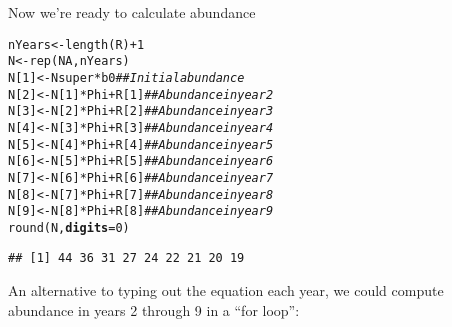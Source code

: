 \documentclass[12pt]{article}\usepackage[]{graphicx}\usepackage[]{color}
\makeatletter
\newcommand{\hlnum}[1]{\textcolor[rgb]{0.69,0.494,0}{#1}}%
\newcommand{\hlcom}[1]{\textcolor[rgb]{0.514,0.506,0.514}{\textit{#1}}}%
\newcommand{\hlopt}[1]{\textcolor[rgb]{0,0,0}{#1}}%
\newcommand{\hlstd}[1]{\textcolor[rgb]{0,0,0}{#1}}%
\newcommand{\hlkwb}[1]{\textcolor[rgb]{0,0.341,0.682}{#1}}%
\newcommand{\hlkwc}[1]{\textcolor[rgb]{0,0,0}{\textbf{#1}}}%
\newcommand{\hlkwd}[1]{\textcolor[rgb]{0.004,0.004,0.506}{#1}}%
\newenvironment{kframe}{%
 \def\at@end@of@kframe{}%
 \ifinner\ifhmode%
  \def\at@end@of@kframe{\end{minipage}}%
  \begin{minipage}{\columnwidth}%
 \fi\fi%
 \def\FrameCommand##1{\hskip\@totalleftmargin \hskip-\fboxsep
 \colorbox{shadecolor}{##1}\hskip-\fboxsep
     \hskip-\linewidth \hskip-\@totalleftmargin \hskip\columnwidth}%
 \MakeFramed {\advance\hsize-\width
   \@totalleftmargin\z@ \linewidth\hsize
   \@setminipage}}%
 {\par\unskip\endMakeFramed%
 \at@end@of@kframe}
\newenvironment{knitrout}{}{} %
\makeatother
\begin{document}
Now we're ready to calculate abundance

\begin{knitrout}
\color{fgcolor}\begin{kframe}
\begin{alltt}
\hlstd{nYears} \hlkwb{<-} \hlkwd{length}\hlstd{(R)}\hlopt{+}\hlnum{1}
\hlstd{N} \hlkwb{<-} \hlkwd{rep}\hlstd{(}\hlnum{NA}\hlstd{, nYears)}
\hlstd{N[}\hlnum{1}\hlstd{]} \hlkwb{<-} \hlstd{Nsuper}\hlopt{*}\hlstd{b0}            \hlcom{## Initial abundance}
\hlstd{N[}\hlnum{2}\hlstd{]} \hlkwb{<-} \hlstd{N[}\hlnum{1}\hlstd{]}\hlopt{*}\hlstd{Phi} \hlopt{+} \hlstd{R[}\hlnum{1}\hlstd{]}      \hlcom{## Abundance in year 2}
\hlstd{N[}\hlnum{3}\hlstd{]} \hlkwb{<-} \hlstd{N[}\hlnum{2}\hlstd{]}\hlopt{*}\hlstd{Phi} \hlopt{+} \hlstd{R[}\hlnum{2}\hlstd{]}      \hlcom{## Abundance in year 3}
\hlstd{N[}\hlnum{4}\hlstd{]} \hlkwb{<-} \hlstd{N[}\hlnum{3}\hlstd{]}\hlopt{*}\hlstd{Phi} \hlopt{+} \hlstd{R[}\hlnum{3}\hlstd{]}      \hlcom{## Abundance in year 4}
\hlstd{N[}\hlnum{5}\hlstd{]} \hlkwb{<-} \hlstd{N[}\hlnum{4}\hlstd{]}\hlopt{*}\hlstd{Phi} \hlopt{+} \hlstd{R[}\hlnum{4}\hlstd{]}      \hlcom{## Abundance in year 5}
\hlstd{N[}\hlnum{6}\hlstd{]} \hlkwb{<-} \hlstd{N[}\hlnum{5}\hlstd{]}\hlopt{*}\hlstd{Phi} \hlopt{+} \hlstd{R[}\hlnum{5}\hlstd{]}      \hlcom{## Abundance in year 6}
\hlstd{N[}\hlnum{7}\hlstd{]} \hlkwb{<-} \hlstd{N[}\hlnum{6}\hlstd{]}\hlopt{*}\hlstd{Phi} \hlopt{+} \hlstd{R[}\hlnum{6}\hlstd{]}      \hlcom{## Abundance in year 7}
\hlstd{N[}\hlnum{8}\hlstd{]} \hlkwb{<-} \hlstd{N[}\hlnum{7}\hlstd{]}\hlopt{*}\hlstd{Phi} \hlopt{+} \hlstd{R[}\hlnum{7}\hlstd{]}      \hlcom{## Abundance in year 8}
\hlstd{N[}\hlnum{9}\hlstd{]} \hlkwb{<-} \hlstd{N[}\hlnum{8}\hlstd{]}\hlopt{*}\hlstd{Phi} \hlopt{+} \hlstd{R[}\hlnum{8}\hlstd{]}      \hlcom{## Abundance in year 9}
\hlkwd{round}\hlstd{(N,} \hlkwc{digits}\hlstd{=}\hlnum{0}\hlstd{)}
\end{alltt}
\begin{verbatim}
## [1] 44 36 31 27 24 22 21 20 19
\end{verbatim}
\end{kframe}
\end{knitrout}

\clearpage

An alternative to typing out the equation each year, we could compute
abundance in years 2 through 9 in a ``for loop'':
\end{document}
